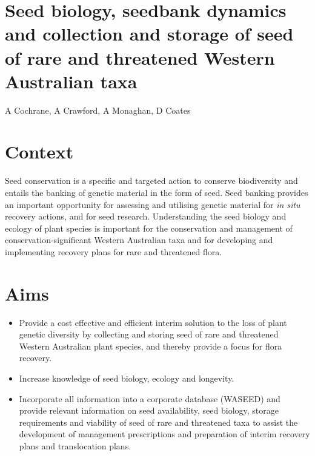 \documentclass[version=last,
    paper=a4, %
    10pt, %
    usenames,
    dvipsnames,
    oneside, %
    headings=openany, %
    DIV=15 %
]{scrbook}
\begin{document}
\section*{Seed biology, seedbank dynamics and collection and storage of seed of
rare and threatened Western Australian taxa
}

A Cochrane, A Crawford, A Monaghan, D Coates


\section*{Context}
Seed conservation is a specific and targeted action to conserve
biodiversity and entails the banking of genetic material in the form of
seed. Seed banking provides an important opportunity for assessing and
utilising genetic material for \emph{in situ} recovery actions, and for
seed research. Understanding the seed biology and ecology of plant
species is important for the conservation and management of
conservation-significant Western Australian taxa and for developing and
implementing recovery plans for rare and threatened flora.



\section*{Aims}
\begin{itemize}
\itemsep1pt\parskip0pt
\item
  Provide a cost effective and efficient interim solution to the loss of
  plant genetic diversity by collecting and storing seed of rare and
  threatened Western Australian plant species, and thereby provide a
  focus for flora recovery.
\item
  Increase knowledge of seed biology, ecology and longevity.
\item
  Incorporate all information into a corporate database (WASEED) and
  provide relevant information on seed availability, seed biology,
  storage requirements and viability of seed of rare and threatened taxa
  to assist the development of management prescriptions and preparation
  of interim recovery plans and translocation plans.
\end{itemize}
\end{document}
